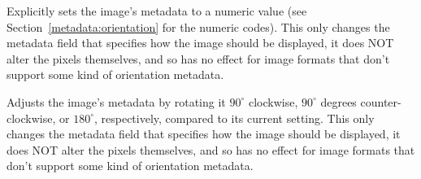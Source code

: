 Explicitly sets the image's  metadata to a numeric
value (see Section~\ref{metadata:orientation} for the numeric codes).
This only changes the metadata field that specifies
how the image should be displayed, it does NOT alter the pixels
themselves, and so has no effect for image formats that don't
support some kind of orientation metadata.
\apiend

Adjusts the image's  metadata by rotating it $90^\circ$
clockwise, $90^\circ$ degrees counter-clockwise, or $180^\circ$,
respectively, compared to its current setting.  This only changes the
metadata field that specifies how the image should be displayed, it does
NOT alter the pixels themselves, and so has no effect for image formats
that don't support some kind of orientation metadata.
\apiend

